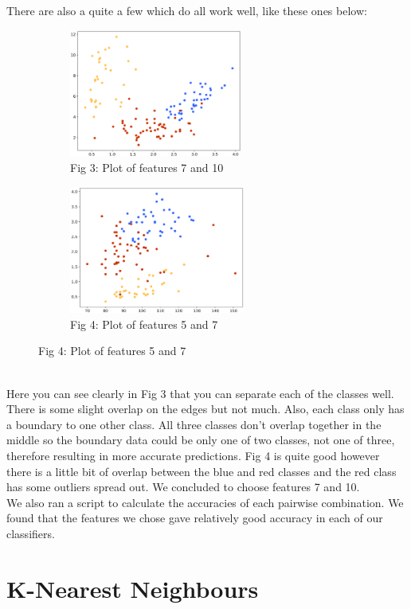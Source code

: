 \documentclass[10pt]{article}
\begin{document}
\noindent
There are also a quite a few which do all work well, like these ones below:

\begin{figure}[h!]
\captionsetup[subfigure]{labelformat=empty}
\begin{subfigure}{.5\textwidth}
\centering
\includegraphics[height=4.2cm]{7and10.png}
\caption{Fig 3: Plot of features 7 and 10}
\end{subfigure}%
\begin{subfigure}{.5\textwidth}
\centering
\includegraphics[height=4.2cm]{5and7.png}
\caption{Fig 4: Plot of features 5 and 7}
\end{subfigure}%
\end{figure}
\noindent
\\
\noindent
Here you can see clearly in Fig 3 that you can separate each of the classes well. There is some slight overlap on the edges but not much. Also, each class only has a boundary to one other class. All three classes don’t overlap together in the middle so the boundary data could be only one of two classes, not one of three, therefore resulting in more accurate predictions. Fig 4 is quite good however there is a little bit of overlap between the blue and red classes and the red class has some outliers spread out. We concluded to choose features 7 and 10.\\

\noindent
We also ran a script to calculate the accuracies of each pairwise combination. We found that the features we chose gave relatively good accuracy in each of our classifiers.

\section*{K-Nearest Neighbours}
\end{document}
